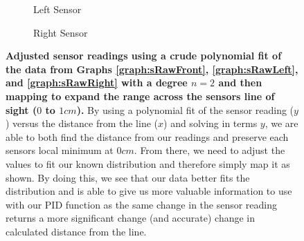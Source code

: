 \documentclass[twocolumn]{article}
\begin{document}
\begin{flushleft}
\begin{figure}[p]
{\begin{subfigure}{\columnwidth}
					\caption{Left Sensor}
					\label{graph:sMappedLeft}
				\end{subfigure}%
				\hfill
				\begin{subfigure}{\columnwidth}
					\centering
					\caption{Right Sensor}
					\label{graph:sMappedRight}
				\end{subfigure}
				\caption{\textbf{Adjusted sensor readings using a crude polynomial fit of the data from Graphs \ref{graph:sRawFront}, \ref{graph:sRawLeft}, and \ref{graph:sRawRight} with a degree $n=2$ and then mapping to expand the range across the sensors line of sight ($0$ to $1cm$).} By using a polynomial fit of the sensor reading ($y$) versus the distance from the line ($x$) and solving in terms $y$, we are able to both find the distance from our readings and preserve each sensors local minimum at $0cm$. From there, we need to adjust the values to fit our known distribution and therefore simply map it as shown. By doing this, we see that our data better fits the distribution and is able to give us more valuable information to use with our PID function as the same change in the sensor reading returns a more significant change (and accurate) change in calculated distance from the line.}\label{graph:sMapped}
			}
		\end{figure}
		

\end{flushleft}
\end{document}
